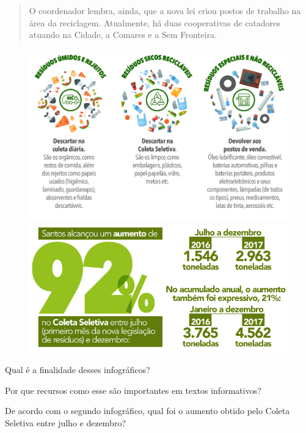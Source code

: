\begin{conteudo}
\begin{conteudo}
\begin{conteudo}
\begin{conteudo}
\begin{quote}
O coordenador lembra, ainda, que a nova lei criou postos de trabalho na
área da reciclagem. Atualmente, há duas cooperativas de catadores
atuando na Cidade, a Comares e a Sem Fronteira.

\end{quote}

\pagebreak

\begin{figure}[htpb!]
\includegraphics[width=.5\textwidth]{media/image30.jpeg}
\includegraphics[width=.5\textwidth]{media/image31.jpeg}
\end{figure}

\begin{escolha}
\item Qual é a finalidade desses infográficos?
\item{}

\item Por que recursos como esse são importantes em textos informativos?
\item{}

\item De acordo com o segundo infográfico, qual foi o aumento obtido
pelo Coleta Seletiva entre julho e dezembro?
\item{}


\end{escolha}
\end{conteudo}
\end{conteudo}
\end{conteudo}
\end{conteudo}
